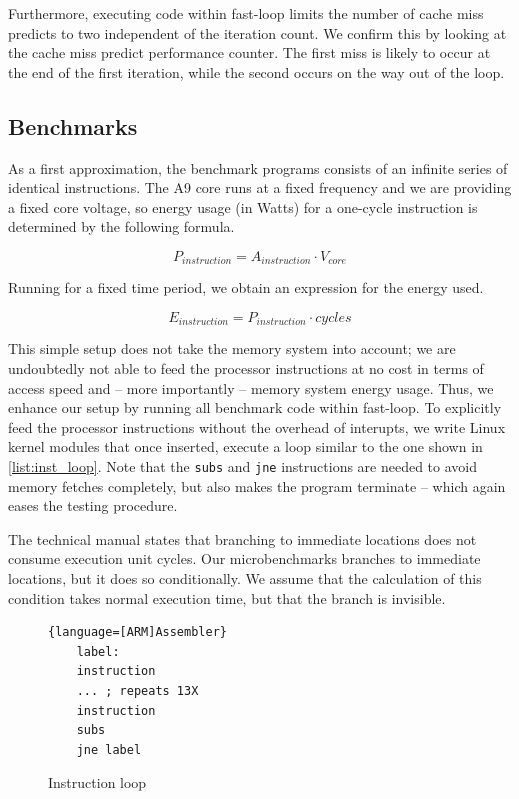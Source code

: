 Furthermore, executing code within fast-loop limits the number of cache
miss predicts to two independent of the iteration count. We confirm this by
looking at the cache miss predict performance counter. The first miss is likely to
occur at the end of the first iteration, while the second occurs on the way out
of the loop.

\subsection{Benchmarks}
As a first approximation, the benchmark programs consists of an infinite series
of identical instructions. The A9 core runs at a fixed frequency and we are
providing a fixed core voltage, so energy usage (in Watts) for a one-cycle
instruction is determined by the following formula.

\begin{equation}
    P_{instruction} = A_{instruction} \cdot V_{core}
    \label{eq:1}
\end{equation}

Running for a fixed time period, we obtain an expression for the energy used.

\begin{equation}
    E_{instruction} = P_{instruction} \cdot cycles
    \label{eq:2}
\end{equation}

This simple setup does not take the memory system into account; we are
undoubtedly not able to feed the processor instructions at no cost in terms of
access speed and -- more importantly -- memory system energy usage. Thus, we
enhance our setup by running all benchmark code within fast-loop. To explicitly
feed the processor instructions without the overhead of interupts, we write
Linux kernel modules that once inserted, execute a loop similar to the one shown
in \autoref{list:inst_loop}. Note that the \texttt{subs} and \texttt{jne}
instructions are needed to avoid memory fetches completely, but also makes the
program terminate -- which again eases the testing procedure.

The technical manual states that branching to immediate locations
does not consume execution unit cycles. Our microbenchmarks branches to
immediate locations, but it does so conditionally. We assume that the
calculation of this condition takes normal execution time, but that the branch
is invisible.

\begin{figure}
    \begin{lstlisting}{language=[ARM]Assembler}
    label:
    instruction
    ... ; repeats 13X
    instruction
    subs
    jne label
    \end{lstlisting}
    \caption{Instruction loop}
    \label{list:inst_loop}
\end{figure}

